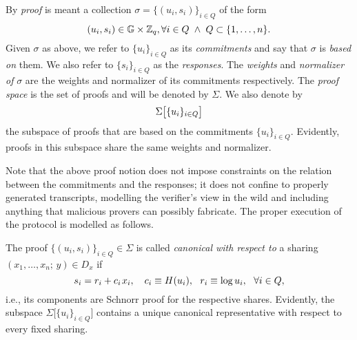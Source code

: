 \documentclass{iacrtrans}
\begin{document}
\begin{defn}\label{orst_proof_def}
By \textit{proof} is meant a collection
$\sigma = \{(u_i, s_i)\}_{i \in Q}$ of the form
\vspace{5pt}
\begin{equation*}\label{orst_proof_form}
(u_i, s_i) \in \mathbb{G} \times \mathbb{Z}_q,
\vspace{2pt}\forall i \in Q
\hspace{3pt}
\land
\hspace{3pt}
Q \subset \{1, \dots, n\}.
\vspace{5pt}
\end{equation*}
Given $\sigma$ as above, we refer to
$\{u_i\}_{i \in Q}$ as its \textit{commitments} and
say that $\sigma$ is \textit{based on} them.
We also refer to $\{s_i\}_{i \in Q}$ as the
\textit{responses}.
The \textit{weights} and \textit{normalizer of} $\sigma$
are the weights and normalizer of its commitments respectively.
The \textit{proof space}
is the set of proofs and will be denoted by $\Sigma$.
We also denote by
\vspace{5pt}
\begin{equation*}\label{orst_proofs_on_commitments}
\Sigma\big[\{u_i\}_{i \in Q}\big]
\vspace{5pt}
\end{equation*}
the subspace of proofs that are
based on the commitments $\{u_i\}_{i \in Q}$.
Evidently, proofs in this subspace
share the same weights and normalizer.
\end{defn}

\noindent
Note that the above proof notion does not impose
constraints on the relation between
the commitments and the responses;
it does not confine
to properly generated transcripts,
modelling the verifier's view in the wild
and including anything that malicious provers can possibly fabricate.
The proper execution of the protocol
is modelled as follows.

\begin{defn}\label{orst_canonical_def}
The proof $\{(u_i, s_i)\}_{i \in Q} \in \Sigma$ is called
\textit{canonical with respect to} a sharing
$(x_1, \dots, x_n;\hspace{2pt} y) \in D_x$ if
\vspace{5pt}
\begin{equation}\label{orst_canonical}
s_i = r_i + c_i \hspace{1pt} x_i,
\ \ \ c_i \equiv H(u_i),
\ \ r_i \equiv \log u_i,
\ \ \forall i \in Q,
\vspace{5pt}
\end{equation}
i.e., its components are Schnorr proof
for the respective shares.
Evidently, the subspace $\Sigma\big[\{u_i\}_{i \in Q}\big]$
contains a unique canonical representative
with respect to every fixed sharing.
\end{defn}
\end{document}
